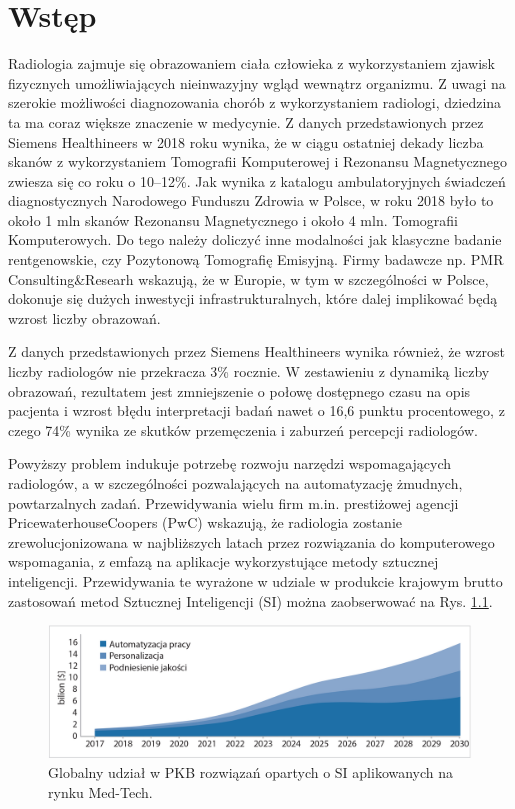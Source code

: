 \chapter{Wstęp}

Radiologia zajmuje się obrazowaniem ciała człowieka z wykorzystaniem zjawisk fizycznych umożliwiających nieinwazyjny wgląd wewnątrz organizmu. Z uwagi na szerokie możliwości diagnozowania chorób z wykorzystaniem radiologi, dziedzina ta ma coraz większe znaczenie w medycynie. Z danych przedstawionych przez Siemens Healthineers w 2018 roku wynika, że w ciągu ostatniej dekady liczba skanów z wykorzystaniem Tomografii Komputerowej i Rezonansu Magnetycznego zwiesza się co roku o 10--12\%. Jak wynika z katalogu ambulatoryjnych świadczeń diagnostycznych Narodowego Funduszu Zdrowia w Polsce, w roku 2018 było to około 1 mln skanów Rezonansu Magnetycznego i około 4 mln. Tomografii Komputerowych. Do tego należy doliczyć inne modalności jak klasyczne badanie rentgenowskie, czy Pozytonową Tomografię Emisyjną. Firmy badawcze np. PMR Consulting\&Researh wskazują, że w Europie, w tym w szczególności w Polsce, dokonuje się dużych inwestycji infrastrukturalnych, które dalej implikować będą wzrost liczby obrazowań.
  
Z danych przedstawionych przez Siemens Healthineers wynika również, że wzrost liczby radiologów nie przekracza 3\% rocznie. W zestawieniu z dynamiką liczby obrazowań, rezultatem jest zmniejszenie o połowę dostępnego czasu na opis pacjenta i wzrost błędu interpretacji badań nawet o 16,6 punktu procentowego, z czego 74\% wynika ze skutków przemęczenia i zaburzeń percepcji radiologów.  


Powyższy problem indukuje potrzebę rozwoju narzędzi wspomagających radiologów, a w szczególności pozwalających na automatyzację żmudnych, powtarzalnych zadań. Przewidywania wielu firm m.in. prestiżowej agencji PricewaterhouseCoopers (PwC) wskazują, że radiologia zostanie zrewolucjonizowana w najbliższych latach przez rozwiązania do komputerowego wspomagania, z emfazą na aplikacje wykorzystujące metody sztucznej inteligencji. Przewidywania te wyrażone w udziale w produkcie krajowym brutto zastosowań metod Sztucznej Inteligencji (SI) można zaobserwować na Rys. \ref{MedTechGrowth}. 
\begin{figure}[h!]
	\centering
	\includegraphics[width=1.0\textwidth]{figures/AI_w_radiologii.jpg}
	\caption{Globalny udział w PKB rozwiązań opartych o SI aplikowanych na rynku Med-Tech.}
	\label{MedTechGrowth}
\end{figure}

